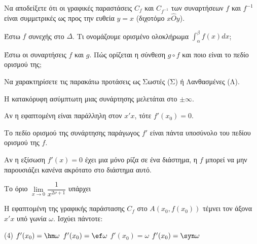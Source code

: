 \documentclass[11pt,a4paper]{article}
\newcommand{\kerkissans}[1]{{\fontfamily{maksf}\selectfont \textbf{#1}}}
\renewcommand{\textdexiakeraia}{}
\newcommand\themanum{A}
\newcounter{thema}[section]
\renewcommand{\thethema}{\arabic{thema}}
\newcommand{\Thema}{\refstepcounter{thema}{\textbf{\textcolor{black}{\faPenSquare\ \  \large \kerkissans{\textbf{\thethemaο\hspace{2mm}Διαγώνισμα - Θέμα \themanum}}}}}\hspace{0mm}}{}
\newenvironment{thema}[1]
{\begin{tcolorbox}[title=\Thema\kerkissans{\textbf{\large{  #1}}},breakable,
enhanced standard,titlerule=0pt,toprule=0pt, rightrule=0pt, bottomrule=0pt,
colback=white,left=0mm,top=1mm,bottom=0mm,
boxrule=0pt,
colframe=white,leftrule=0mm,sharp corners,coltitle=black]
\renewcommand{\themanum}{#1}}
{\end{tcolorbox}}
\begin{document}
\begin{thema}{A}
\begin{erwthma}
    \item Να αποδείξετε ότι οι γραφικές παραστάσεις $ C_f $ και $ C_{f^{-1}} $ των συναρτήσεων $ f $ και $ f^{-1} $ είναι συμμετρικές ως προς την ευθεία $ y=x $ (διχοτόμο $x\hat{O}y$).
    \item Έστω $f$ συνεχής στο $\Delta$. Τι ονομάζουμε ορισμένο ολοκλήρωμα $\int_\alpha^\beta f(x) dx$;
    \item Έστω οι συναρτήσεις $f$ και $g$. Πώς ορίζεται η σύνθεση $g \circ f$ και ποιο είναι το πεδίο ορισμού της;
    \item Να χαρακτηρίσετε τις παρακάτω προτάσεις ως Σωστές (Σ) ή Λανθασμένες (Λ).
    \begin{alist}
        \item Η κατακόρυφη ασύμπτωτη μιας συνάρτησης μελετάται στο $\pm \infty$.
        \item Αν η εφαπτομένη είναι παράλληλη στον $x'x$, τότε $f'(x_0) = 0$.
        \item Το πεδίο ορισμού της συνάρτησης παράγωγος $f'$ είναι πάντα υποσύνολο του πεδίου ορισμού της $f$.
        \item Αν η εξίσωση $f'(x)=0$ έχει μια μόνο ρίζα σε ένα διάστημα, η $f$ μπορεί να μην παρουσιάζει κανένα ακρότατο στο διάστημα αυτό.
        \item Το όριο $\lim\limits_{x\to 0}{\dfrac{1}{x^{2\nu+1}}}$ υπάρχει
    \end{alist}
    \item Η εφαπτομένη της γραφικής παράστασης $C_f$ στο $A(x_0, f(x_0))$ τέμνει τον άξονα $x'x$ υπό γωνία $\omega$. Ισχύει πάντοτε:
    \begin{tasks}[label=\let\textdexiakeraia\relax\alph*.](4)
        \task $f'(x_0) = \hm \omega$
        \task $f'(x_0) = \ef \omega$
        \task $f'(x_0) = \omega$
        \task $f'(x_0) = \syn \omega$
    \end{tasks}


    \newpage
\end{erwthma}
\end{thema}
\vspace{1cm}
\end{document}
